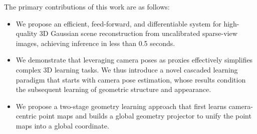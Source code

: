 The primary contributions of this work are as follows:
\begin{itemize}[leftmargin=1.5em]
\item We propose an efficient, feed-forward, and differentiable system for high-quality 3D Gaussian scene reconstruction from uncalibrated sparse-view images, achieving inference in less than 0.5 seconds.

\item We demonstrate that leveraging camera poses as proxies effectively simplifies complex 3D learning tasks. We thus introduce a novel cascaded learning paradigm that starts with camera pose estimation, whose results condition the subsequent learning of geometric structure and appearance. 

\item We propose a two-stage geometry learning approach that first learns camera-centric point maps and builds a global geometry
projector to unify the point maps into a global coordinate.

\end{itemize}


